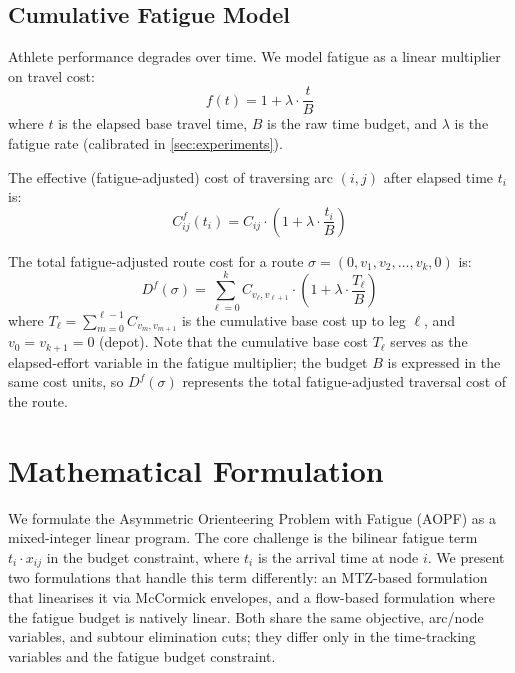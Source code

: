 \documentclass[preprint,11pt]{elsarticle}
\begin{document}
\subsection{Cumulative Fatigue Model}
\label{sec:fatigue}

Athlete performance degrades over time.
We model fatigue as a linear multiplier on travel cost:
\begin{equation}
  f(t) = 1 + \lambda \cdot \frac{t}{B}
  \label{eq:fatigue}
\end{equation}
where $t$ is the elapsed base travel time, $B$ is the raw time budget, and $\lambda$ is the fatigue rate (calibrated in \cref{sec:experiments}).

The effective (fatigue-adjusted) cost of traversing arc $(i,j)$ after elapsed time $t_i$ is:
\begin{equation}
  C^f_{ij}(t_i) = C_{ij} \cdot \left(1 + \lambda \cdot \frac{t_i}{B}\right)
  \label{eq:fatigue_cost}
\end{equation}

The total fatigue-adjusted route cost for a route $\sigma = (0, v_1, v_2, \ldots, v_k, 0)$ is:
\begin{equation}
  D^f(\sigma) = \sum_{\ell=0}^{k} C_{v_\ell, v_{\ell+1}} \cdot \left(1 + \lambda \cdot \frac{T_\ell}{B}\right)
  \label{eq:total_fatigue}
\end{equation}
where $T_\ell = \sum_{m=0}^{\ell-1} C_{v_m, v_{m+1}}$ is the cumulative base cost up to leg $\ell$, and $v_0 = v_{k+1} = 0$ (depot).
Note that the cumulative base cost $T_\ell$ serves as the elapsed-effort variable in the fatigue multiplier; the budget $B$ is expressed in the same cost units, so $D^f(\sigma)$ represents the total fatigue-adjusted traversal cost of the route.


\section{Mathematical Formulation}
\label{sec:formulation}

We formulate the Asymmetric Orienteering Problem with Fatigue (AOPF) as a mixed-integer linear program.
The core challenge is the bilinear fatigue term $t_i \cdot x_{ij}$ in the budget constraint, where $t_i$ is the arrival time at node $i$.
We present two formulations that handle this term differently: an MTZ-based formulation that linearises it via McCormick envelopes, and a flow-based formulation where the fatigue budget is natively linear.
Both share the same objective, arc/node variables, and subtour elimination cuts; they differ only in the time-tracking variables and the fatigue budget constraint.
\end{document}
